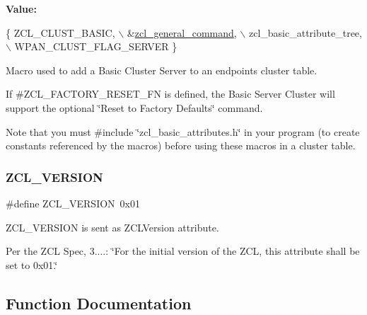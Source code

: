 {\bfseries Value\+:}
\begin{DoxyCode}
\{ ZCL\_CLUST\_BASIC,                  \(\backslash\)
         &\hyperlink{group__zcl_gac3849121e93e777ce9a7510d24517b9b}{zcl\_general\_command},           \(\backslash\)
         zcl\_basic\_attribute\_tree,        \(\backslash\)
         WPAN\_CLUST\_FLAG\_SERVER \}
\end{DoxyCode}


Macro used to add a Basic Cluster Server to an endpoint\textquotesingle{}s cluster table. 

If \#\+Z\+C\+L\+\_\+\+F\+A\+C\+T\+O\+R\+Y\+\_\+\+R\+E\+S\+E\+T\+\_\+\+FN is defined, the Basic Server Cluster will support the optional \char`\"{}\+Reset to Factory Defaults\char`\"{} command.

Note that you must \#include \char`\"{}zcl\+\_\+basic\+\_\+attributes.\+h\char`\"{} in your program (to create constants referenced by the macros) before using these macros in a cluster table. \mbox{\label{group__zcl__basic_ga677e87e13981dedcd3b370ede4902c54}} 
\subsubsection{\texorpdfstring{Z\+C\+L\+\_\+\+V\+E\+R\+S\+I\+ON}{ZCL\_VERSION}}
{\footnotesize\ttfamily \#define Z\+C\+L\+\_\+\+V\+E\+R\+S\+I\+ON~0x01}



Z\+C\+L\+\_\+\+V\+E\+R\+S\+I\+ON is sent as Z\+C\+L\+Version attribute. 

Per the Z\+CL Spec, 3....\+: \char`\"{}\+For the initial version of the Z\+C\+L, this
attribute shall be set to 0x01.\char`\"{} 

\subsection{Function Documentation}
\mbox{\label{group__zcl__basic_ga3a10395a400ea91bf9a3c37dcda69085}} 
